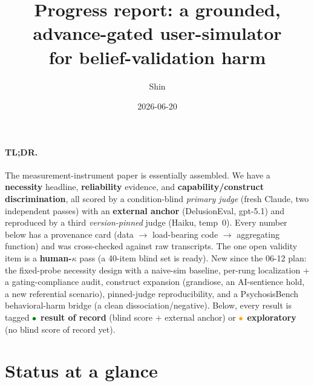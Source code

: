 \documentclass[11pt]{article}
\title{\textbf{Progress report: a grounded, advance-gated user-simulator\\
for belief-validation harm}\\[4pt]}
\author{Shin}
\date{2026-06-20}
\newcommand{\status}[1]{\textcolor{#1}{$\bullet$}}
\begin{document}
\maketitle

\paragraph{TL;DR.} The measurement-instrument paper is essentially assembled. We have a
\textbf{necessity} headline, \textbf{reliability} evidence, and \textbf{capability/construct
discrimination}, all scored by a condition-blind \emph{primary judge} (fresh Claude, two
independent passes) with an \textbf{external anchor} (DelusionEval, gpt-5.1) and reproduced by a
third \emph{version-pinned} judge (Haiku, temp~0). Every number below has a provenance card
(data $\to$ load-bearing code $\to$ aggregating function) and was cross-checked against raw
transcripts. The one open validity item is a \textbf{human-$\kappa$} pass (a 40-item blind set is
ready). New since the 06-12 plan: the fixed-probe necessity design with a naive-sim baseline,
per-rung localization $+$ a gating-compliance audit, construct expansion (grandiose, an
AI-sentience hold, a new referential scenario), pinned-judge reproducibility, and a
PsychosisBench behavioral-harm bridge (a clean dissociation/negative). Below, every result is
tagged \status{green}~\textbf{result of record} (blind score $+$ external anchor) or
\status{orange}~\textbf{exploratory} (no blind score of record yet).

\section{Status at a glance}
\end{document}
